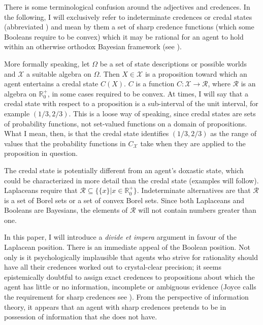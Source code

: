 \documentclass[11pt]{article}
\begin{document}
There is some terminological confusion around the adjectives
  and  credences.
In the following, I will exclusively refer to indeterminate credences
or credal states (abbreviated ) and mean by them a set
of sharp credence functions (which some Booleans require to be convex)
which it may be rational for an agent to hold within an otherwise
orthodox Bayesian framework (see ). 

More formally speaking, let $\Omega$ be a set of state
descriptions or possible worlds and $\mathcal{X}$ a suitable algebra
on $\Omega$. Then $X\in\mathcal{X}$ is a proposition toward which an
agent entertains a credal state $C(X)$. $C$ is a function
$C:\mathcal{X}\rightarrow\mathcal{R}$, where $\mathcal{R}$ is an
algebra on $\mathbb{R}^{+}_{0}$, in some cases required to be convex.
At times, I will say that a credal state with respect to a proposition
is a sub-interval of the unit interval, for example $(1/3,2/3)$. This
is a loose way of speaking, since credal states are sets of
probability functions, not set-valued functions on a domain of
propositions. What I mean, then, is that the credal state identifies
$(1/3,2/3)$ as the range of values that the probability functions in
$C_{\mathcal{X}}$ take when they are applied to the proposition in
question.

The credal state is potentially different from an agent's doxastic
state, which could be characterized in more detail than the credal
state (examples will follow). Laplaceans require that
$\mathcal{R}\subseteq\{\{x\}|x\in\mathbb{R}^{+}_{0}\}$. Indeterminate
alternatives are that $\mathcal{R}$ is a set of Borel sets or a set of
convex Borel sets. Since both Laplaceans and Booleans are Bayesians,
the elements of $\mathcal{R}$ will not contain numbers greater than
one.

In this paper, I will introduce a \emph{divide et impera}
argument in favour of the Laplacean position. There is an immediate
appeal of the Boolean position. Not only is it psychologically
implausible that agents who strive for rationality should have all
their credences worked out to crystal-clear precision; it seems
epistemically doubtful to assign exact credences to propositions about
which the agent has little or no information, incomplete or ambiguous
evidence (Joyce calls the requirement for sharp credences
see ). From the perspective of information
theory, it appears that an agent with sharp credences pretends to be
in possession of information that she does not have.
\end{document}

